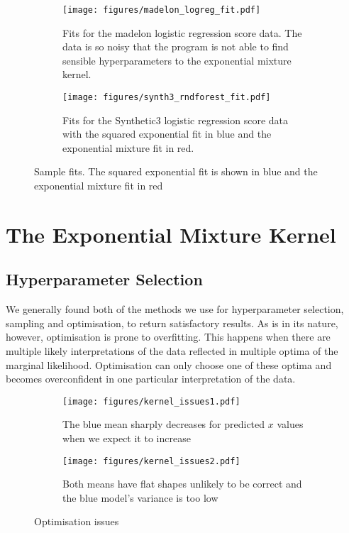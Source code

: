 \documentclass[a4paper,12pt,twoside,openright]{report}
\begin{document}
\begin{figure}[h]
\centering
\begin{subfigure}{.45\textwidth}
\centering
  \texttt{[image: figures/madelon\_logreg\_fit.pdf]}
  \caption{Fits for the madelon logistic regression score data. The data is so noisy that the program is not able to find sensible hyperparameters to the exponential mixture kernel.}
  \label{madelon_logreg_fit}
\end{subfigure}
\begin{subfigure}{.45\textwidth}
\centering
  \texttt{[image: figures/synth3\_rndforest\_fit.pdf]}
  \caption{Fits for the Synthetic3 logistic regression score data with the squared exponential fit in blue and the exponential mixture fit in red.}
  \label{synth3_rndforest_fit}
\end{subfigure}
\caption{Sample fits. The squared exponential fit is shown in blue and the exponential mixture fit in red}
\label{fits}
\end{figure}

\section{The Exponential Mixture Kernel}

\subsection{Hyperparameter Selection}

We generally found both of the methods we use for hyperparameter selection, sampling and optimisation, to return satisfactory results. As is in its nature, however, optimisation is prone to overfitting. This happens when there are multiple likely interpretations of the data reflected in multiple optima of the marginal likelihood. Optimisation can only choose one of these optima and becomes overconfident in one particular interpretation of the data.

\begin{figure}[t]
\centering
\begin{subfigure}{.45\textwidth}
  \centering
  \texttt{[image: figures/kernel\_issues1.pdf]}
\caption{The blue mean sharply decreases for predicted $x$ values when we expect it to increase}
  \label{kernel_issues1}
\end{subfigure}%
\begin{subfigure}{.45\textwidth}
  \centering
  \texttt{[image: figures/kernel\_issues2.pdf]}
  \caption{Both means have flat shapes unlikely to be correct and the blue model's variance is too low}
  \label{kernel_issues2}
\end{subfigure}
\caption{Optimisation issues}
\label{kernel_issues_big1}
\end{figure}
\end{document}
